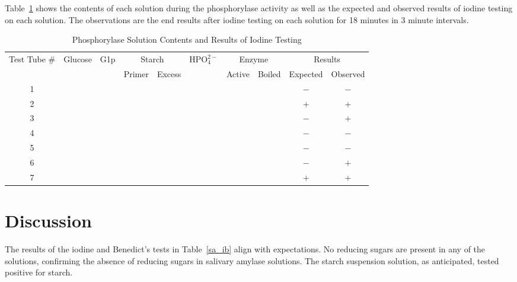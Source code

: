 \documentclass[12pt]{article}
\begin{document}
        Table~\ref{p_results} shows the contents of each solution during the phosphorylase activity as well as the expected and observed results of iodine testing on each solution. The observations are the end results after iodine testing on each solution for 18 minutes in 3 minute intervals.
        \begin{table}[H]
            \caption{Phosphorylase Solution Contents and Results of Iodine Testing}
            \centering
            \begin{tabular}{@{}cccccccccc@{}}
                \toprule
                \multirow{2}{*}{\parbox{1.5cm}{\centering Test Tube \#}} & \multirow{2}{*}{Glucose} & \multirow{2}{*}{G1p} & \multicolumn{2}{c}{Starch} & \multirow{2}{*}{\(\text{HPO}_4^{2-}\) } & \multicolumn{2}{c}{Enzyme} & \multicolumn{2}{c}{Results} \\ 
                \cmidrule(lr){4-5} \cmidrule(lr){7-8} \cmidrule(lr){9-10} 
                &  &  & Primer & Excess &  & Active & Boiled & Expected & Observed \\ 
                \midrule
                1 & \blacksquare{} & \Square{} & \blacksquare{} & \Square{} & \Square{} & \blacksquare{} & \Square{} & \(-\) & \(-\) \\
                2 & \Square{} & \blacksquare{} & \blacksquare{} & \Square{} & \Square{} & \blacksquare{} & \Square{} & \(+\) & \(+\) \\
                3 & \Square{} & \blacksquare{} & \Square{} & \Square{} & \Square{} & \blacksquare{} & \Square{} & \(-\) & \(+\) \\
                4 & \Square{} & \blacksquare{} & \blacksquare{} & \Square{} & \Square{} & \Square{} & \blacksquare{} & \(-\) & \(-\) \\
                5 & \Square{} & \blacksquare{} & \blacksquare{} & \Square{} & \blacksquare{} & \blacksquare{} & \Square{} & \(-\) & \(-\) \\
                6 & \Square{} & \Square{} & \Square{} & \blacksquare{} & \blacksquare{} & \blacksquare{} & \Square{} & \(-\) & \(+\) \\
                7 & \Square{} & \Square{} & \Square{} & \blacksquare{} & \blacksquare{} & \Square{} & \blacksquare{} & \(+\) & \(+\) \\
                \bottomrule
            \end{tabular}\label{p_results}
        \end{table}

    \section*{Discussion}
        The results of the iodine and Benedict's tests in Table~\ref{sa_ib} align with expectations. 
        No reducing sugars are present in any of the solutions, confirming the absence of reducing sugars in salivary amylase solutions. 
        The starch suspension solution, as anticipated, tested positive for starch.
\end{document}
